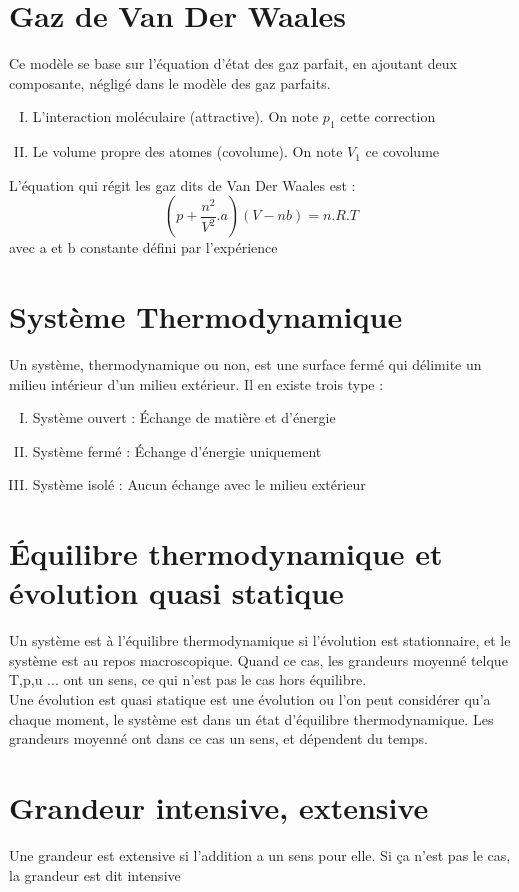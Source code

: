 \section{Gaz de Van Der Waales}
Ce modèle se base sur l'équation d'état des gaz parfait, en ajoutant deux composante, négligé dans le modèle des gaz parfaits. 
\begin{enumerate}[I) ]
 \item L'interaction moléculaire (attractive). On note $p_1$ cette correction
 \item Le volume propre des atomes (covolume). On note $V_1$ ce covolume
\end{enumerate}
L'équation qui régit les gaz dits de Van Der Waales est : 
$$(p+\dfrac{n^2}{V^2}.a)(V-nb) = n.R.T$$
avec a et b constante défini par l'expérience

\section{Système Thermodynamique}
\begin{de}
Un système, thermodynamique ou non, est une surface fermé qui délimite un milieu intérieur d'un milieu extérieur. Il en existe trois type : 
\begin{enumerate}[I) ]
 \item Système ouvert : Échange de matière et d'énergie
 \item Système fermé : Échange d'énergie uniquement
 \item Système isolé : Aucun échange avec le milieu extérieur
\end{enumerate}
\end{de}

\section{Équilibre thermodynamique et évolution quasi statique}
\begin{de}
Un système est à l'équilibre thermodynamique si l'évolution est stationnaire, et le système est au repos macroscopique. Quand ce cas, les grandeurs moyenné telque T,p,u ... ont un sens, ce qui n'est pas le cas hors équilibre.\\
Une évolution est quasi statique est une évolution ou l'on peut considérer qu'a chaque moment, le système est dans un état d'équilibre thermodynamique. Les grandeurs moyenné ont dans ce cas un sens, et dépendent du temps.
\end{de}
\section{Grandeur intensive, extensive}
\begin{de}
 Une grandeur est extensive si l'addition a un sens pour elle. Si ça n'est pas le cas, la grandeur est dit intensive
\end{de}
